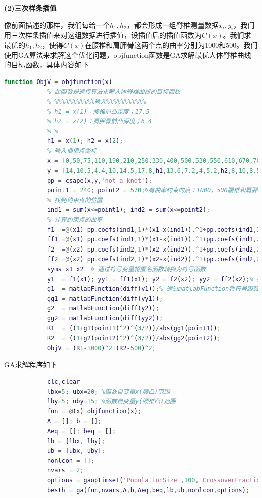             \textbf{(2)三次样条插值}
            \par
            像前面描述的那样，我们每给一个$h_1,h_2$，都会形成一组脊椎测量数据$x_i,y_i$，我们用三次样条插值来对这组数据进行插值，设插值后的插值函数为$C(x)$。我们求最优的$h_1,h_2$，使得$C(x)$在腰椎和肩胛骨这两个点的曲率分别为1000和500。我们使用GA算法来求解这个优化问题，objfunction函数是GA求解最优人体脊椎曲线的目标函数，具体内容如下
            \begin{lstlisting}[language = Matlab]
            function ObjV = objfunction(x)
            % 此函数是遗传算法求解人体脊椎曲线的目标函数
            % %%%%%%%%%%%输入%%%%%%%%%%%
            % h1 = x(1)：腰椎前凸深度；17.5
            % h2 = x(2)：肩胛骨前凸深度；6.4
            % %
            h1 = x(1); h2 = x(2);
            % 输入插值点坐标
            x = [0,50,75,110,190,210,250,330,400,500,530,550,610,670,705,750,847];
            y = [14,10,5,4.4,10,14.5,17.8,h1,13.6,7.2,4,5.2,h2,8,10,8.5,5.6];
            pp = csape(x,y,'not-a-knot');
            point1 = 240; point2 = 570;%有曲率约束的点：1000，500腰椎和肩胛骨
            % 找到约束点的位置
            ind1 = sum(x<=point1); ind2 = sum(x<=point2);
            % 计算约束点的曲率
            f1  =@(x1) pp.coefs(ind1,1)*(x1-x(ind1)).^1+pp.coefs(ind1,2)*(x1-x(ind1)).^2+pp.coefs(ind1,3)*(x1-x(ind1)).^3+pp.coefs(ind1,4);
            ff1 =@(x1) pp.coefs(ind1,1)*(x1-x(ind1)).^1+pp.coefs(ind1,2)*(x1-x(ind1)).^2+pp.coefs(ind1,3)*(x1-x(ind1)).^3+pp.coefs(ind1,4);
            f2  =@(x2) pp.coefs(ind2,1)*(x2-x(ind2)).^1+pp.coefs(ind2,2)*(x2-x(ind2)).^2+pp.coefs(ind2,3)*(x2-x(ind2)).^3+pp.coefs(ind2,4);
            ff2 =@(x2) pp.coefs(ind2,1)*(x2-x(ind2)).^1+pp.coefs(ind2,2)*(x2-x(ind2)).^2+pp.coefs(ind2,3)*(x2-x(ind2)).^3+pp.coefs(ind2,4);
            syms x1 x2  % 通过符号变量将匿名函数转换为符号函数
            y1  = f1(x1); yy1 = ff1(x1); y2 = f2(x2); yy2 = ff2(x2);% 符号函数，可求导
            g1  = matlabFunction(diff(y1));% 通过matlabFunction将符号函数转换为匿名函数
            gg1 = matlabFunction(diff(yy1));
            g2  = matlabFunction(diff(y2));
            gg2 = matlabFunction(diff(yy2));
            R1  = ((1+g1(point1)^2)^(3/2))/abs(gg1(point1));
            R2  = ((1+g2(point2)^2)^(3/2))/abs(gg2(point2));
            ObjV = (R1-1000)^2+(R2-500)^2;
            \end{lstlisting}
            GA求解程序如下
            \begin{lstlisting}[language = Matlab]
            % 设脊椎曲线为分段三次样条函数，且在腰椎和肩胛骨的曲率为1000和500
            clc,clear
            lbx=5; ubx=20; %函数自变量x(腰凸)范围
            lby=5; uby=15; %函数自变量y(颈椎凸)范围
            fun = @(x) objfunction(x);
            A = []; b = [];
            Aeq = []; beq = [];
            lb = [lbx, lby];
            ub = [ubx, uby];
            nonlcon = [];
            nvars = 2;
            options = gaoptimset('PopulationSize',100,'CrossoverFraction',0.75,'Generations',20,'StallGenLimit',40,'PlotFcns',{@gaplotbestf,@gaplotbestindiv}); %参数设置
            besth = ga(fun,nvars,A,b,Aeq,beq,lb,ub,nonlcon,options);
            \end{lstlisting}
